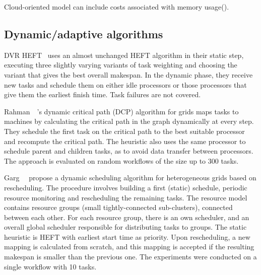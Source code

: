 \documentclass[conference]{IEEEtran}
\begin{document}
    Cloud-oriented model can include costs associated with memory usage(\cite{liang2020memory}).

    \subsection{Dynamic/adaptive algorithms}

    DVR HEFT~\cite{SANDOKJI2019482} uses an almost unchanged HEFT algorithm in their static step, executing three slightly
    varying variants of task weighting and choosing the variant that gives the best overall makespan.
    In the dynamic phase, they receive new tasks and schedule them on either idle processors or those processors that give them
    the earliest finish time.
    Task failures are not covered.

    Rahman~\etal~\cite{rahman2013}'s dynamic critical path (DCP) algorithm for grids maps tasks to machines
    by calculating the critical path in the graph dynamically at every step.
    They schedule the first task on the critical path to the best suitable processor and recompute the critical path.
    The heuristic also uses the same processor to schedule parent and children tasks, as to avoid data transfer between processors.
    The approach is evaluated on random workflows of the size up to 300 tasks.


    Garg~\etal~\cite{GARG2015256} propose a dynamic scheduling algorithm for heterogeneous grids based on rescheduling.
    The procedure involves building a first (static) schedule, periodic resource monitoring and rescheduling the remaining
    tasks.
    The resource model contains resource groups (small tightly-connected sub-clusters), connected between each other.
    For each resource group, there is an own scheduler, and an overall global scheduler responsible for distributing
    tasks to groups.
    The static heuristic is HEFT with earliest start time as priority.
    Upon rescheduling, a new mapping is calculated from scratch, and this mapping is accepted if the resulting makespan
    is smaller than the previous one.
    The experiments were conducted on a single workflow with 10 tasks.
%
\end{document}
